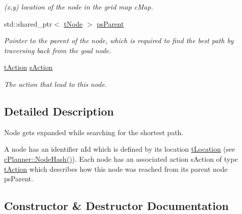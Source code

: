 \begin{DoxyCompactItemize}
\begin{DoxyCompactList}\small\item\em (x,y) location of the node in the grid map c\+Map. \end{DoxyCompactList}\item 
\mbox{\label{structplanner_1_1t_node_a297a5f7f75357b7a2eb2728ad452ff98}} 
std\+::shared\+\_\+ptr$<$ \mbox{\hyperlink{structplanner_1_1t_node}{t\+Node}} $>$ \mbox{\hyperlink{structplanner_1_1t_node_a297a5f7f75357b7a2eb2728ad452ff98}{ps\+Parent}}
\begin{DoxyCompactList}\small\item\em Pointer to the parent of the node, which is required to find the best path by traversing back from the goal node. \end{DoxyCompactList}\item 
\mbox{\label{structplanner_1_1t_node_ad64b2f4aead654e8e187a9bbb0be483c}} 
\mbox{\hyperlink{structplanner_1_1t_action}{t\+Action}} \mbox{\hyperlink{structplanner_1_1t_node_ad64b2f4aead654e8e187a9bbb0be483c}{s\+Action}}
\begin{DoxyCompactList}\small\item\em The action that lead to this node. \end{DoxyCompactList}\end{DoxyCompactItemize}


\subsection{Detailed Description}
Node gets expanded while searching for the shortest path. 

A node has an identifier n\+Id which is defined by its location \mbox{\hyperlink{structplanner_1_1t_location}{t\+Location}} (see \mbox{\hyperlink{classplanner_1_1c_planner_a4c99873ce64b214899d65eda6366455f}{c\+Planner\+::\+Node\+Hash()}}). Each node has an associated action s\+Action of type \mbox{\hyperlink{structplanner_1_1t_action}{t\+Action}} which describes how this node was reached from its parent node ps\+Parent. 

\subsection{Constructor \& Destructor Documentation}
\mbox{\label{structplanner_1_1t_node_a83ff217ef060b93698045b2357999594}} 
